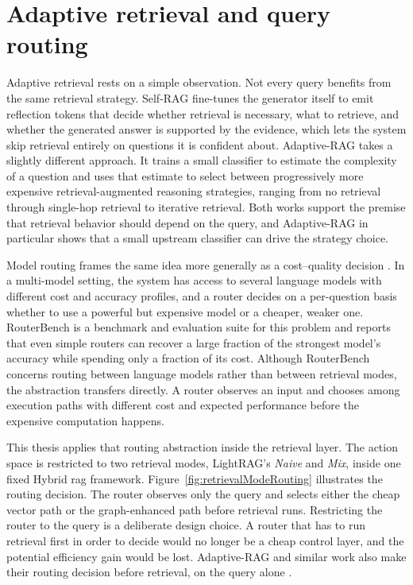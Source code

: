\documentclass[english, bibtex]{kththesis}               %
\numberwithin{listing}{chapter}
\begin{document}
\section{Adaptive retrieval and query routing}
\label{sec:backgroundAdaptiveRetrieval}

Adaptive retrieval rests on a simple observation. Not every query benefits from the same retrieval strategy. Self-RAG \cite{asai2023selfrag} fine-tunes the generator itself to emit reflection tokens that decide whether retrieval is necessary, what to retrieve, and whether the generated answer is supported by the evidence, which lets the system skip retrieval entirely on questions it is confident about. Adaptive-RAG \cite{jeong2024adaptiverag} takes a slightly different approach. It trains a small classifier to estimate the complexity of a question and uses that estimate to select between progressively more expensive retrieval-augmented reasoning strategies, ranging from no retrieval through single-hop retrieval to iterative retrieval. Both works support the premise that retrieval behavior should depend on the query, and Adaptive-RAG in particular shows that a small upstream classifier can drive the strategy choice.

Model routing frames the same idea more generally as a cost--quality decision \cite{hu2024routerbench}. In a multi-model setting, the system has access to several language models with different cost and accuracy profiles, and a router decides on a per-question basis whether to use a powerful but expensive model or a cheaper, weaker one. RouterBench \cite{hu2024routerbench} is a benchmark and evaluation suite for this problem and reports that even simple routers can recover a large fraction of the strongest model's accuracy while spending only a fraction of its cost. Although RouterBench concerns routing between language models rather than between retrieval modes, the abstraction transfers directly. A router observes an input and chooses among execution paths with different cost and expected performance before the expensive computation happens.

This thesis applies that routing abstraction inside the retrieval layer. The action space is restricted to two retrieval modes, LightRAG's \emph{Naive} and \emph{Mix}, inside one fixed Hybrid \gls{rag} framework. Figure~\ref{fig:retrievalModeRouting} illustrates the routing decision. The router observes only the query and selects either the cheap vector path or the graph-enhanced path before retrieval runs. Restricting the router to the query is a deliberate design choice. A router that has to run retrieval first in order to decide would no longer be a cheap control layer, and the potential efficiency gain would be lost. Adaptive-RAG and similar work also make their routing decision before retrieval, on the query alone \cite{jeong2024adaptiverag,hu2024routerbench}.
\end{document}

